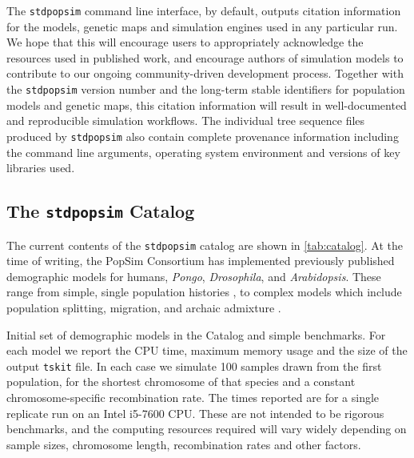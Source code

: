 \documentclass[12pt,halfline,a4paper]{ouparticle}
\newcommand{\stdpopsim}{\texttt{stdpopsim}\xspace}
\newcommand{\tskit}{\texttt{tskit}\xspace}
\begin{document}
The \stdpopsim command line interface, by default, outputs citation information
for the models, genetic maps and simulation engines used in any particular run.
We hope that this will encourage users to appropriately acknowledge the
resources used in published work, and encourage authors
of simulation models to contribute to our ongoing community-driven development process.
Together with the \stdpopsim version number and the long-term stable identifiers
for population models and genetic maps,
this citation information will result in well-documented and reproducible
simulation workflows. The individual tree sequence files produced by
\stdpopsim also contain complete provenance information including the command
line arguments, operating system environment and versions of key libraries
used.

\subsection*{The \stdpopsim Catalog}
The current contents of the \stdpopsim catalog are shown in \autoref{tab:catalog}. At the time of
writing, the PopSim Consortium has implemented previously published demographic models for
humans, \emph{Pongo}, \emph{Drosophila}, and \emph{Arabidopsis}.
These range from
simple, single population histories \cite[e.g.,][]{sheehan2016deep},
to complex models which include population splitting, migration, and archaic
admixture \cite[e.g.,][]{ragsdale2019models}.

\renewcommand{\arraystretch}{1.2}
\begin{table}[t]
\makebox[\textwidth][c]{
    \begin{footnotesize}
    
    \end{footnotesize}
}
\caption{\label{tab:catalog}
Initial set of demographic models in the Catalog and simple benchmarks.
For each model we report the CPU time, maximum memory usage and the
size of the output \tskit file. In each case we simulate 100 samples
drawn from the first population, for the shortest chromosome of that species
and a constant chromosome-specific recombination rate.
The times reported are for a single replicate run on an Intel i5-7600 CPU.
These are not intended to be rigorous benchmarks, and the computing resources
required will vary widely depending on sample sizes, chromosome length,
recombination rates and other factors.
}
\end{table}
\end{document}
